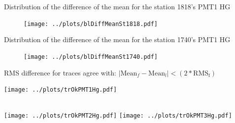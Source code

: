 \documentclass[aspectratio=169]{beamer}
\begin{document}
\begin{frame}
  Distribution of the difference of the mean for the station 1818's PMT1 HG
  \begin{figure}[h]
    \centering
    \texttt{[image: ../plots/blDiffMeanSt1818.pdf]}
    \end{figure}
\end{frame}

\begin{frame}
  Distribution of the difference of the mean for the station 1740's PMT1 HG
  \begin{figure}[h]
    \centering
    \texttt{[image: ../plots/blDiffMeanSt1740.pdf]}
    \end{figure}
\end{frame}

%
%
%


\begin{frame}
	RMS difference for traces agree with: $\mid \mathrm{Mean}_f - \mathrm{Mean}_l \mid < \left( 2*\mathrm{RMS_f} \right) $

  \centering
	\texttt{[image: ../plots/trOkPMT1Hg.pdf]}\quad%
	\begin{minipage}[b][0.4\textheight][c]
		{.45\linewidth}
	\end{minipage}\\[1em]
	\texttt{[image: ../plots/trOkPMT2Hg.pdf]}\quad%
	\texttt{[image: ../plots/trOkPMT3Hg.pdf]}
\end{frame}


%
%
\end{document}
